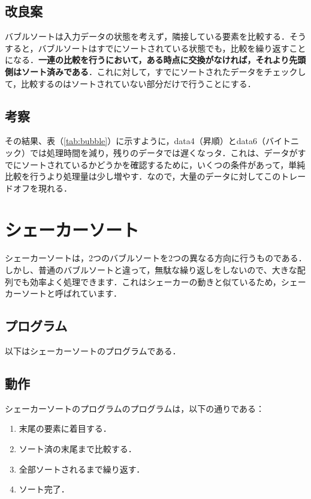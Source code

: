 \documentclass[a4j, titlepage]{jarticle}
\begin{document}
        \subsection{改良案}
            バブルソートは入力データの状態を考えず，隣接している要素を比較する．そうすると，バブルソートはすでにソートされている状態でも，比較を繰り返すことになる．\textbf{一連の比較を行うにおいて，ある時点に交換がなければ，それより先頭側はソート済みである}\cite{cite:boyoh}．これに対して，すでにソートされたデータをチェックして，比較するのはソートされていない部分だけで行うことにする．
        
        \subsection{考察}
            その結果、表（\ref{tab:bubble}）に示すように，data4（昇順）とdata6（バイトニック）では処理時間を減り，残りのデータでは遅くなっタ．これは、データがすでにソートされているかどうかを確認するために，いくつの条件があって，単純比較を行うより処理量は少し増やす．なので，大量のデータに対してこのトレードオフを現れる．

        
    \section{シェーカーソート}
        シェーカーソートは，2つのバブルソートを2つの異なる方向に行うものである．しかし、普通のバブルソートと違って，無駄な繰り返しをしないので、大きな配列でも効率よく処理できます\cite{cite:geek}．これはシェーカーの動きと似ているため，シェーカーソートと呼ばれています．

        \subsection{プログラム}
            以下はシェーカーソートのプログラムである．
            
        
        \subsection{動作}
            シェーカーソートのプログラムのプログラムは，以下の通りである：
            \begin{enumerate}
                \item 末尾の要素に着目する．
                \item ソート済の末尾まで比較する．
                \item 全部ソートされるまで繰り返す．
                \item ソート完了．
            \end{enumerate}
\end{document}
